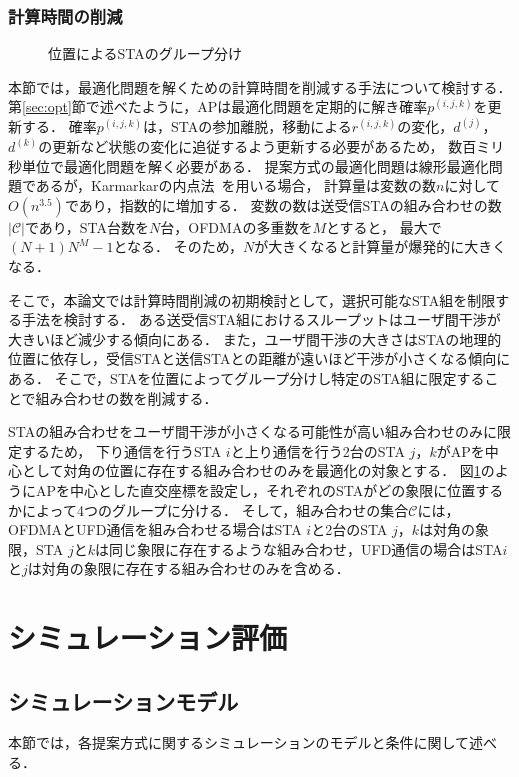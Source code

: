 \documentclass[master]{kuisthesis}		%
\newcommand{\pijk}{p^{(i,j,k)}}
\newcommand{\rijk}{r^{(i,j,k)}}
\newcommand{\mthc}{\mathcal C}
\begin{document}
		\subsubsection{計算時間の削減}\label{sec:time}
			\begin{figure}[t]
				\centering
				\caption{位置によるSTAのグループ分け}
				\label{fig:time_image}
			\end{figure}
			本節では，最適化問題を解くための計算時間を削減する手法について検討する．
			第\ref{sec:opt}節で述べたように，APは最適化問題を定期的に解き確率$\pijk$を更新する．
			確率$\pijk$は，STAの参加離脱，移動による$\rijk$の変化，$d^{(j)}$，$d^{(k)}$の更新など状態の変化に追従するよう更新する必要があるため，
			数百ミリ秒単位で最適化問題を解く必要がある．
			提案方式の最適化問題は線形最適化問題であるが，Karmarkarの内点法~\cite{karmarkar}を用いる場合，
			計算量は変数の数$n$に対して$O(n^{3.5})$であり，指数的に増加する．
			変数の数は送受信STAの組み合わせの数$|{\mthc}|$であり，STA台数を$N$台，OFDMAの多重数を$M$とすると，
			最大で$(N+1)N^M-1$となる．
			そのため，$N$が大きくなると計算量が爆発的に大きくなる．
			\par
			そこで，本論文では計算時間削減の初期検討として，選択可能なSTA組を制限する手法を検討する．
			ある送受信STA組におけるスループットはユーザ間干渉が大きいほど減少する傾向にある．
			また，ユーザ間干渉の大きさはSTAの地理的位置に依存し，受信STAと送信STAとの距離が遠いほど干渉が小さくなる傾向にある．
			そこで，STAを位置によってグループ分けし特定のSTA組に限定することで組み合わせの数を削減する．
			\par
			STAの組み合わせをユーザ間干渉が小さくなる可能性が高い組み合わせのみに限定するため，
			下り通信を行うSTA $i$と上り通信を行う2台のSTA $j$，$k$がAPを中心として対角の位置に存在する組み合わせのみを最適化の対象とする．
			図\ref{fig:time_image}のようにAPを中心とした直交座標を設定し，それぞれのSTAがどの象限に位置するかによって4つのグループに分ける．
			そして，組み合わせの集合$\mthc$には，OFDMAとUFD通信を組み合わせる場合はSTA $i$と2台のSTA $j$，$k$は対角の象限，STA $j$と$k$は同じ象限に存在するような組み合わせ，UFD通信の場合はSTA$i$と$j$は対角の象限に存在する組み合わせのみを含める．

\section{シミュレーション評価}
	\subsection{シミュレーションモデル}
		本節では，各提案方式に関するシミュレーションのモデルと条件に関して述べる．
\end{document}
